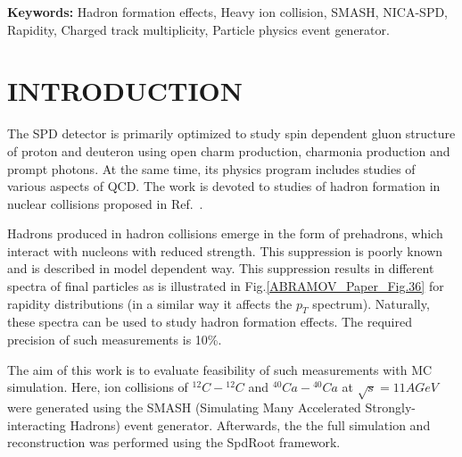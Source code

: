 \documentclass[12pt]{article}
\providecommand{\keywords}{\small\textbf{Keywords: }} %
\begin{document}
\keywords{Hadron formation effects, Heavy ion collision, SMASH, NICA-SPD, Rapidity, Charged track multiplicity, Particle physics event generator.}


\section{INTRODUCTION}
The SPD detector is primarily optimized to study spin dependent
gluon structure of proton and deuteron using open charm production,
charmonia production and prompt photons. At the same time, 
its physics program includes studies of various aspects of QCD.
The work is devoted to studies of hadron formation in nuclear
collisions proposed in Ref.~\cite{Abramov:2021vtu}.

Hadrons produced in hadron collisions emerge in the form of prehadrons,
which interact with nucleons with reduced strength. This suppression is
poorly known and is described in model dependent way. This suppression
results in different spectra of final particles as is illustrated in
Fig.\ref{ABRAMOV_Paper_Fig.36} for rapidity distributions (in a similar
way it affects the $p_T$ spectrum). Naturally, these spectra
can be used  to study hadron formation effects. The required precision
of such measurements is 10\%.

The aim of this work is to evaluate  feasibility of such measurements
with MC simulation. Here, ion collisions of $^{12}C-{^{12}C}$ and $^{40}Ca-{^{40}Ca}$ at $\sqrt{s}=11 AGeV$ were generated using the SMASH (Simulating Many Accelerated Strongly-interacting Hadrons) event generator. Afterwards, the the full simulation and reconstruction was performed using the SpdRoot framework.


\end{document}
